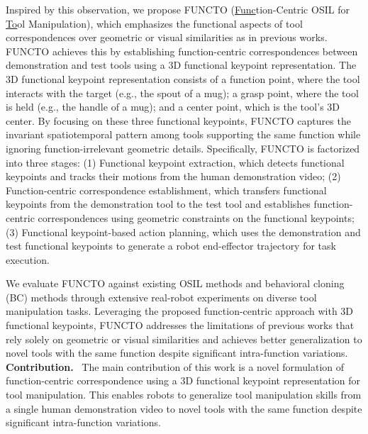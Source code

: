 Inspired by this observation, we propose FUNCTO (\underline{Func}tion-Centric OSIL for \underline{To}ol Manipulation), which emphasizes the functional aspects of tool correspondences over geometric or visual similarities as in previous works. FUNCTO achieves this by establishing function-centric correspondences between demonstration and test tools using a 3D functional keypoint representation. The 3D functional keypoint representation consists of a function point, where the tool interacts with the target (e.g., the spout of a mug); a grasp point, where the tool is held (e.g., the handle of a mug); and a center point, which is the tool's 3D center. By focusing on these three functional keypoints, FUNCTO captures the invariant spatiotemporal pattern among tools supporting the same function while ignoring function-irrelevant geometric details. Specifically, FUNCTO is factorized into three stages: (1) Functional keypoint extraction, which detects functional keypoints and tracks their motions from the human demonstration video; (2) Function-centric correspondence establishment, which transfers functional keypoints from the demonstration tool to the test tool and establishes function-centric correspondences using geometric constraints on the functional keypoints; (3) Functional keypoint-based action planning, which uses the demonstration and test functional keypoints to generate a robot end-effector trajectory for task execution.

We evaluate FUNCTO against existing OSIL methods and behavioral cloning (BC) methods through extensive real-robot experiments on diverse tool manipulation tasks. Leveraging the proposed function-centric approach with 3D functional keypoints, FUNCTO addresses the limitations of previous works that rely solely on geometric or visual similarities and achieves better generalization to novel tools with the same function despite significant intra-function variations. \\

\noindent \textbf{Contribution.} \ The main contribution of this work is a novel formulation of function-centric correspondence using a 3D functional keypoint representation for tool manipulation. This enables robots to generalize tool manipulation skills from a single human demonstration video to novel tools with the same function despite significant intra-function variations.













